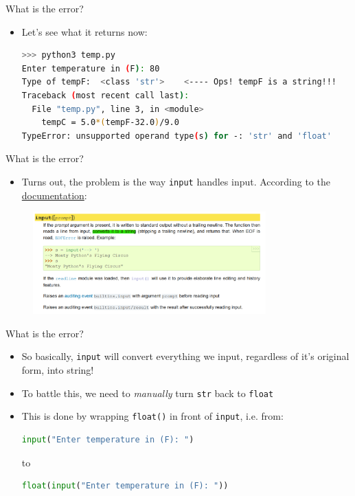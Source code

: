 \documentclass[10pt,xcolor={table,dvipsnames},t]{beamer}
\begin{document}
\begin{frame}[fragile]{What is the error?}
  \begin{itemize}
    \item Let's see what it returns now:
\begin{lstlisting}[language=bash]
>>> python3 temp.py
Enter temperature in (F): 80
Type of tempF:  <class 'str'>    <---- Ops! tempF is a string!!!
Traceback (most recent call last):
  File "temp.py", line 3, in <module>
    tempC = 5.0*(tempF-32.0)/9.0
TypeError: unsupported operand type(s) for -: 'str' and 'float'
\end{lstlisting}
  \end{itemize}
\end{frame}

\begin{frame}[fragile]{What is the error?}
  \begin{itemize}
    \item Turns out, the problem is the way \texttt{input} handles input. According to the \href{https://docs.python.org/3/library/functions.html#input}{documentation}:
  \end{itemize}
  \begin{figure}
    \centering
    \includegraphics[width=0.8\textwidth]{img/python-docs.png}
  \end{figure}
\end{frame}

\begin{frame}[fragile]{What is the error?}
  \begin{itemize}
    \item So basically, \texttt{input} will convert everything we input, regardless of it's original form, into string!
    \item To battle this, we need to \textit{manually} turn \texttt{str} back to \texttt{float}
    \item This is done by wrapping \texttt{float()} in front of \texttt{input}, i.e. from:
\begin{lstlisting}[language=python]
input("Enter temperature in (F): ")
\end{lstlisting}
to
\begin{lstlisting}[language=python]
float(input("Enter temperature in (F): "))
\end{lstlisting}
  \end{itemize}
\end{frame}
\end{document}
